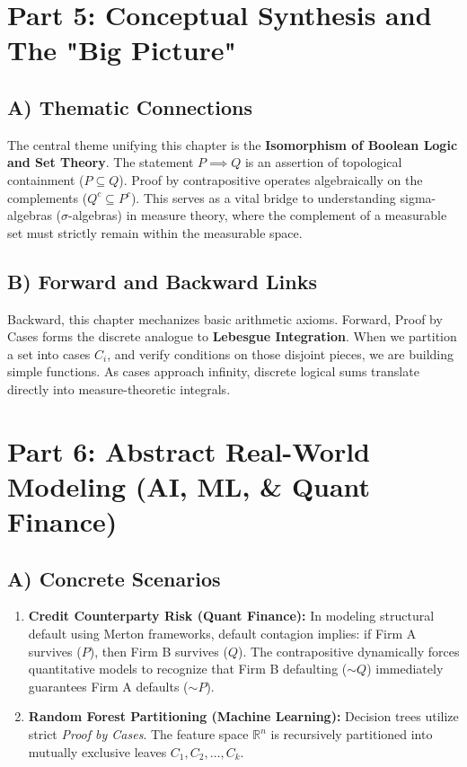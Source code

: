 \documentclass[11pt]{article}
\begin{document}
\newpage
\section{Part 5: Conceptual Synthesis and The "Big Picture"}

\subsection{A) Thematic Connections}
The central theme unifying this chapter is the \textbf{Isomorphism of Boolean Logic and Set Theory}. The statement $P \implies Q$ is an assertion of topological containment ($P \subseteq Q$). Proof by contrapositive operates algebraically on the complements ($Q^c \subseteq P^c$). This serves as a vital bridge to understanding sigma-algebras ($\sigma$-algebras) in measure theory, where the complement of a measurable set must strictly remain within the measurable space.

\subsection{B) Forward and Backward Links}
Backward, this chapter mechanizes basic arithmetic axioms. Forward, Proof by Cases forms the discrete analogue to \textbf{Lebesgue Integration}. When we partition a set into cases $C_i$, and verify conditions on those disjoint pieces, we are building simple functions. As cases approach infinity, discrete logical sums translate directly into measure-theoretic integrals.

\section{Part 6: Abstract Real-World Modeling (AI, ML, \& Quant Finance)}

\subsection{A) Concrete Scenarios}
\begin{enumerate}
    \item \textbf{Credit Counterparty Risk (Quant Finance):} In modeling structural default using Merton frameworks, default contagion implies: if Firm A survives ($P$), then Firm B survives ($Q$). The contrapositive dynamically forces quantitative models to recognize that Firm B defaulting ($\sim Q$) immediately guarantees Firm A defaults ($\sim P$).
    \item \textbf{Random Forest Partitioning (Machine Learning):} Decision trees utilize strict \textit{Proof by Cases}. The feature space $\mathbb{R}^n$ is recursively partitioned into mutually exclusive leaves $C_1, C_2, \dots, C_k$.
\end{enumerate}
\end{document}
